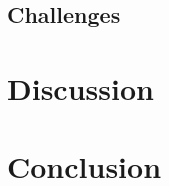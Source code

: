\documentclass[utf8,english]{gradu3}
\begin{document}
\section{Challenges}




\chapter{Discussion}



\chapter{Conclusion}



\hfuzz=3.5pt
\printbibliography
\hfuzz=0pt
\end{document}
